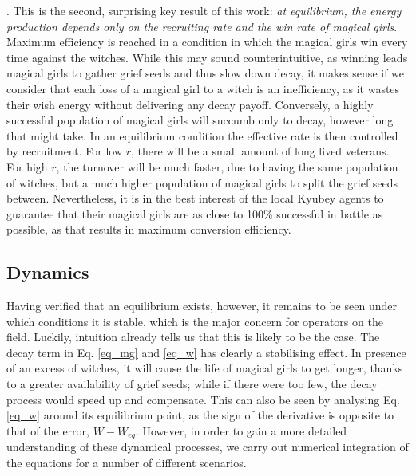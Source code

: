 \documentclass[]{article}
\begin{document}
. This is the second, surprising key result of this work: \textit{at equilibrium, the energy production depends only on the recruiting rate and the win rate of magical girls}. Maximum efficiency is reached in a condition in which the magical girls win every time against the witches. While this may sound counterintuitive, as winning leads magical girls to gather grief seeds and thus slow down decay, it makes sense if we consider that each loss of a magical girl to a witch is an inefficiency, as it wastes their wish energy without delivering any decay payoff. Conversely, a highly successful population of magical girls will succumb only to decay, however long that might take. In an equilibrium condition the effective rate is then controlled by recruitment. For low $r$, there will be a small amount of long lived veterans. For high $r$, the turnover will be much faster, due to having the same population of witches, but a much higher population of magical girls to split the grief seeds between. Nevertheless, it is in the best interest of the local Kyubey agents to guarantee that their magical girls are as close to 100\% successful in battle as possible, as that results in maximum conversion efficiency.

\subsection{Dynamics}

Having verified that an equilibrium exists, however, it remains to be seen under which conditions it is stable, which is the major concern for operators on the field. Luckily, intuition already tells us that this is likely to be the case. The decay term in Eq. \ref{eq_mg} and \ref{eq_w} has clearly a stabilising effect. In presence of an excess of witches, it will cause the life of magical girls to get longer, thanks to a greater availability of grief seeds; while if there were too few, the decay process would speed up and compensate. This can also be seen by analysing Eq. \ref{eq_w} around its equilibrium point, as the sign of the derivative is opposite to that of the error, $W-W_{eq}$. However, in order to gain a more detailed understanding of these dynamical processes, we carry out numerical integration of the equations for a number of different scenarios.\newline
\end{document}
